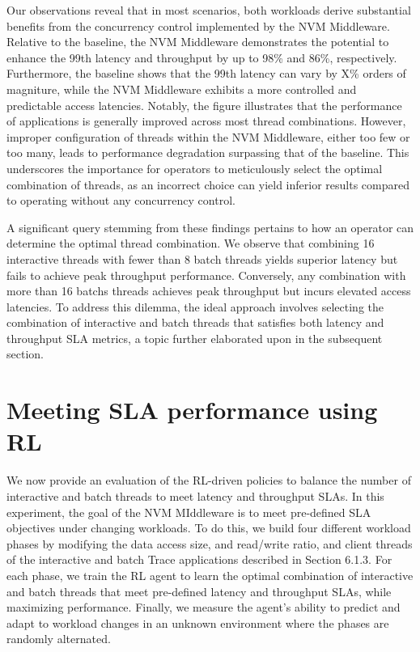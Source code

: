 Our observations reveal that in most scenarios, both workloads derive substantial benefits from the concurrency control implemented by the NVM Middleware. Relative to the baseline, the NVM Middleware demonstrates the potential to enhance the 99th latency and throughput by up to 98\% and 86\%, respectively. Furthermore, the baseline shows that the 99th latency can vary by X\% orders of magniture, while the NVM Middleware exhibits a more controlled and predictable access latencies. Notably, the figure illustrates that the performance of applications is generally improved across most thread combinations. However, improper configuration of threads within the NVM Middleware, either too few or too many, leads to performance degradation surpassing that of the baseline. This underscores the importance for operators to meticulously select the optimal combination of threads, as an incorrect choice can yield inferior results compared to operating without any concurrency control.

A significant query stemming from these findings pertains to how an operator can determine the optimal thread combination. We observe that combining 16 interactive threads with fewer than 8 batch threads yields superior latency but fails to achieve peak throughput performance. Conversely, any combination with more than 16 batchs threads achieves peak throughput but incurs elevated access latencies. To address this dilemma, the ideal approach involves selecting the combination of interactive and batch threads that satisfies both latency and throughput SLA metrics, a topic further elaborated upon in the subsequent section.

\section{Meeting SLA performance using RL}
We now provide an evaluation of the RL-driven policies to balance the number of interactive and batch threads to meet latency and throughput SLAs. In this experiment, the goal of the NVM MIddleware is to meet pre-defined SLA objectives under changing workloads. To do this, we build four different workload phases by modifying the data access size, and read/write ratio, and client threads of the interactive and batch Trace applications described in Section 6.1.3. For each phase, we train the RL agent to learn the optimal combination of interactive and batch threads that meet pre-defined latency and throughput SLAs, while maximizing performance. Finally, we measure the agent's ability to predict and adapt to workload changes in an unknown environment where the phases are randomly alternated. 

